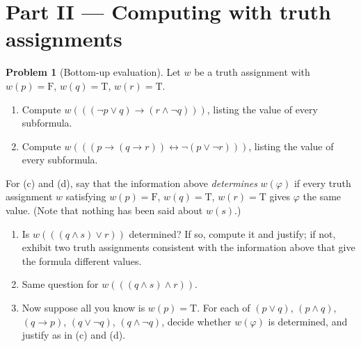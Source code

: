 \documentclass[11pt]{article}
\newcommand{\T}{\mathrm{T}}
\newcommand{\F}{\mathrm{F}}
\theoremstyle{definition}
\newtheorem{problem}{Problem}
\begin{document}
\section*{Part II --- Computing with truth assignments}

\begin{problem}[Bottom-up evaluation]
Let $w$ be a truth assignment with $w(p)=\F$, $w(q)=\T$, $w(r)=\T$.
\begin{enumerate}
\item[(a)] Compute $w(((\lnot p\lor q)\to(r\land\lnot q)))$, listing the value of
every subformula.
\item[(b)] Compute $w(((p\to(q\to r))\leftrightarrow\lnot(p\lor\lnot r)))$,
listing the value of every subformula.
\end{enumerate}
For (c) and (d), say that the information above \emph{determines} $w(\varphi)$ if
every truth assignment $w$ satisfying $w(p)=\F$, $w(q)=\T$, $w(r)=\T$ gives
$\varphi$ the same value. (Note that nothing has been said about $w(s)$.)
\begin{enumerate}
\item[(c)] Is $w(((q\land s)\lor r))$ determined? If so, compute it and justify;
if not, exhibit two truth assignments consistent with the information above that
give the formula different values.
\item[(d)] Same question for $w(((q\land s)\land r))$.
\item[(e)] Now suppose all you know is $w(p)=\T$. For each of
$(p\lor q)$, $(p\land q)$, $(q\to p)$, $(q\lor\lnot q)$, $(q\land\lnot q)$,
decide whether $w(\varphi)$ is determined, and justify as in (c) and (d).
\end{enumerate}
\end{problem}
\end{document}

